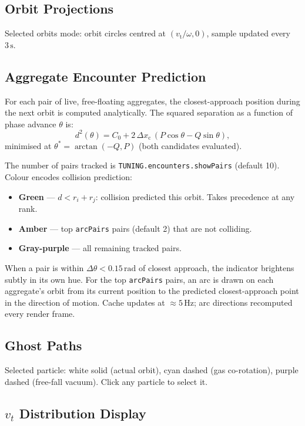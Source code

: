 \documentclass[12pt, a4paper]{article}
\newcommand{\vt}{v_{\mathrm{t}}}
\newcommand{\xc}{x_{\mathrm{c}}}
\newcommand{\omg}{\omega}
\begin{document}
\subsection{Orbit Projections}

Selected orbits mode: orbit circles centred at $(\vt/\omg, 0)$, sample
updated every $3\,\mathrm{s}$.

\subsection{Aggregate Encounter Prediction}

For each pair of live, free-floating aggregates, the closest-approach position
during the next orbit is computed analytically. The squared separation as a
function of phase advance $\theta$ is:
\begin{equation}
  d^2(\theta) = C_0 + 2\,\Delta\xc\,(P\cos\theta - Q\sin\theta),
\end{equation}
minimised at $\theta^* = \arctan(-Q, P)$ (both candidates evaluated).

The number of pairs tracked is \texttt{TUNING.encounters.showPairs} (default
10). Colour encodes collision prediction:
\begin{itemize}
  \item \textbf{Green} --- $d < r_i + r_j$: collision predicted this orbit.
    Takes precedence at any rank.
  \item \textbf{Amber} --- top \texttt{arcPairs} pairs (default 2) that are
    not colliding.
  \item \textbf{Gray-purple} --- all remaining tracked pairs.
\end{itemize}
When a pair is within $\Delta\theta < 0.15\,\mathrm{rad}$ of closest approach,
the indicator brightens subtly in its own hue. For the top \texttt{arcPairs}
pairs, an arc is drawn on each aggregate's orbit from its current position to
the predicted closest-approach point in the direction of motion. Cache updates
at $\approx 5\,\mathrm{Hz}$; arc directions recomputed every render frame.

\subsection{Ghost Paths}

Selected particle: white solid (actual orbit), cyan dashed (gas co-rotation),
purple dashed (free-fall vacuum). Click any particle to select it.

\subsection{\texorpdfstring{$v_t$}{vt} Distribution Display}
\end{document}
